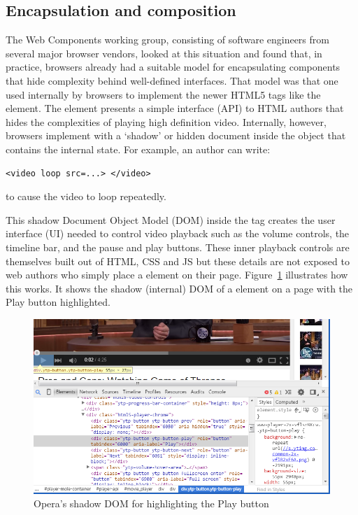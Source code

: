 \subsection{Encapsulation and composition}

The Web Components working group, consisting of software engineers from several major browser vendors, looked at this situation and found that, in practice, browsers already had a suitable model for encapsulating components that hide complexity behind well-defined interfaces.
That model was that one used internally by browsers to implement the newer HTML5 tags like the \textbf{} element. 
The  element presents a simple interface (API) to HTML authors that hides the complexities of playing high definition video.
Internally, however, browsers implement  with a `shadow' or hidden document inside the object that contains the internal state. 
For example, an author can write:
\begin{lstlisting}[language=HTML5,numbers=none]
	<video loop src=...> </video>
\end{lstlisting}
to cause the video to loop repeatedly.

This shadow Document Object Model (DOM) inside the  tag creates the user interface (UI) needed to control video playback such as the volume controls, the timeline bar, and the pause and play buttons.
These inner playback controls are themselves built out of HTML, CSS and JS but these details are not exposed to web authors who simply place a  element on their page. 
Figure~\ref{f:html5video} illustrates how this works. It shows the shadow (internal) DOM of a  element on a page with the Play button  highlighted.

% 
\begin{figure}[htb]
\centering
 \includegraphics[width=5.5in]{images/html5_video_control.png}
\caption{Opera's shadow DOM for  highlighting the Play button}
\label{f:html5video}
\end{figure}
%

